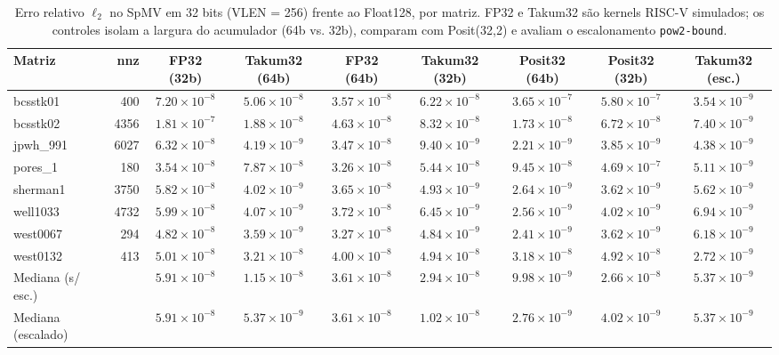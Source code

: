 \begin{table}[t]
\caption{Erro relativo $\ell_2$ no SpMV em 32 bits (VLEN = 256) frente ao Float128, por matriz. FP32 e Takum32 s\~ao kernels RISC-V simulados; os controles isolam a largura do acumulador (64b vs. 32b), comparam com Posit(32,2) e avaliam o escalonamento \texttt{pow2-bound}.}
\label{tab:precisao32}
\centering
\scriptsize
\setlength{\tabcolsep}{3.2pt}
\renewcommand{\arraystretch}{0.96}
\begin{tabular}{@{}lrccccccc@{}}
\toprule
Matriz & nnz & FP32 (32b) & Takum32 (64b) & FP32 (64b) & Takum32 (32b) & Posit32 (64b) & Posit32 (32b) & Takum32 (esc.) \\
\midrule
bcsstk01 & 400 & $7.20 \times 10^{-8}$ & $5.06 \times 10^{-8}$ & $3.57 \times 10^{-8}$ & $6.22 \times 10^{-8}$ & $3.65 \times 10^{-7}$ & $5.80 \times 10^{-7}$ & $3.54 \times 10^{-9}$ \\
bcsstk02 & 4356 & $1.81 \times 10^{-7}$ & $1.88 \times 10^{-8}$ & $4.63 \times 10^{-8}$ & $8.32 \times 10^{-8}$ & $1.73 \times 10^{-8}$ & $6.72 \times 10^{-8}$ & $7.40 \times 10^{-9}$ \\
jpwh\_991 & 6027 & $6.32 \times 10^{-8}$ & $4.19 \times 10^{-9}$ & $3.47 \times 10^{-8}$ & $9.40 \times 10^{-9}$ & $2.21 \times 10^{-9}$ & $3.85 \times 10^{-9}$ & $4.38 \times 10^{-9}$ \\
pores\_1 & 180 & $3.54 \times 10^{-8}$ & $7.87 \times 10^{-8}$ & $3.26 \times 10^{-8}$ & $5.44 \times 10^{-8}$ & $9.45 \times 10^{-8}$ & $4.69 \times 10^{-7}$ & $5.11 \times 10^{-9}$ \\
sherman1 & 3750 & $5.82 \times 10^{-8}$ & $4.02 \times 10^{-9}$ & $3.65 \times 10^{-8}$ & $4.93 \times 10^{-9}$ & $2.64 \times 10^{-9}$ & $3.62 \times 10^{-9}$ & $5.62 \times 10^{-9}$ \\
well1033 & 4732 & $5.99 \times 10^{-8}$ & $4.07 \times 10^{-9}$ & $3.72 \times 10^{-8}$ & $6.45 \times 10^{-9}$ & $2.56 \times 10^{-9}$ & $4.02 \times 10^{-9}$ & $6.94 \times 10^{-9}$ \\
west0067 & 294 & $4.82 \times 10^{-8}$ & $3.59 \times 10^{-9}$ & $3.27 \times 10^{-8}$ & $4.84 \times 10^{-9}$ & $2.41 \times 10^{-9}$ & $3.62 \times 10^{-9}$ & $6.18 \times 10^{-9}$ \\
west0132 & 413 & $5.01 \times 10^{-8}$ & $3.21 \times 10^{-8}$ & $4.00 \times 10^{-8}$ & $4.94 \times 10^{-8}$ & $3.18 \times 10^{-8}$ & $4.92 \times 10^{-8}$ & $2.72 \times 10^{-9}$ \\
\midrule
Mediana (s/ esc.) & & $5.91 \times 10^{-8}$ & $1.15 \times 10^{-8}$ & $3.61 \times 10^{-8}$ & $2.94 \times 10^{-8}$ & $9.98 \times 10^{-9}$ & $2.66 \times 10^{-8}$ & $5.37 \times 10^{-9}$ \\
Mediana (escalado) & & $5.91 \times 10^{-8}$ & $5.37 \times 10^{-9}$ & $3.61 \times 10^{-8}$ & $1.02 \times 10^{-8}$ & $2.76 \times 10^{-9}$ & $4.02 \times 10^{-9}$ & $5.37 \times 10^{-9}$ \\
\bottomrule
\end{tabular}
\end{table}
